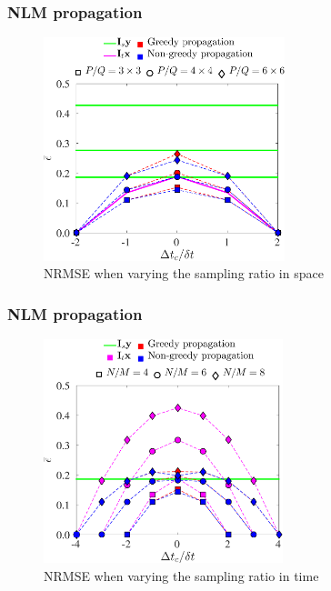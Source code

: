 \documentclass{beamer}
\newcommand{\backupend}{
   \setcounter{framenumber}{\value{finalframe}}
}
\begin{document}
\begin{frame}
	\frametitle{NLM propagation} 
	\begin{figure}
	\centering
		\includegraphics[height=6.5cm]{./figures/NLM/interpdiff/NLmean_interps_NRMSE_vary_spacespacing.eps}
		\caption{NRMSE when varying the sampling ratio in space}
	\end{figure}
\end{frame}


\begin{frame}
	\frametitle{NLM propagation} 
	\begin{figure}
	\centering
		\includegraphics[height=6.5cm]{./figures/NLM/interpdiff/NLmean_interps_NRMSE_vary_timespacing.eps}
		\caption{NRMSE when varying the sampling ratio in time}
	\end{figure}
\end{frame}
\backupend
\end{document}
